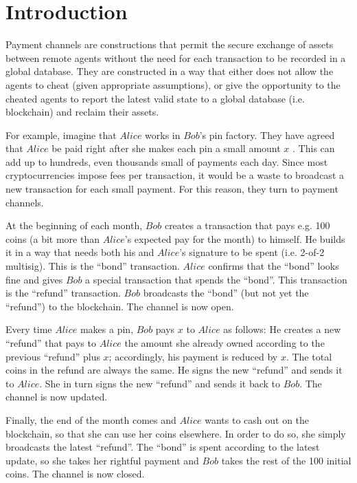 \section{Introduction}
  Payment channels are constructions that permit the secure exchange of assets between
  remote agents without the need for each transaction to be recorded in a global database.
  They are constructed in a way that either does not allow the agents to cheat (given
  appropriate assumptions), or give the opportunity to the cheated agents to report the
  latest valid state to a global database (i.e. blockchain) and reclaim their assets.

  For example, imagine that $Alice$ works in $Bob$'s pin factory. They have agreed that
  $Alice$ be paid right after she makes each pin a small amount $x$ \cite{bdevguide}. This
  can add up to hundreds, even thousands small of payments each day. Since most
  cryptocurrencies impose fees per transaction, it would be a waste to broadcast a new
  transaction for each small payment. For this reason, they turn to payment channels.

  At the beginning of each month, $Bob$ creates a transaction that pays e.g. 100 coins (a
  bit more than $Alice$'s expected pay for the month) to himself. He builds it in a way
  that needs both his and $Alice$'s signature to be spent (i.e. 2-of-2 multisig). This is
  the ``bond'' transaction. $Alice$ confirms that the ``bond'' looks fine and gives $Bob$
  a special transaction that spends the ``bond''. This transaction is the ``refund''
  transaction. $Bob$ broadcasts the ``bond'' (but not yet the ``refund'') to the
  blockchain. The channel is now open.

  Every time $Alice$ makes a pin, $Bob$ pays $x$ to $Alice$ as follows: He creates a new
  ``refund'' that pays to $Alice$ the amount she already owned according to the previous
  ``refund'' plus $x$; accordingly, his payment is reduced by $x$. The total coins in
  the refund are always the same. He signs the new ``refund'' and sends it to $Alice$. She
  in turn signs the new ``refund'' and sends it back to $Bob$. The channel is now updated.

  Finally, the end of the month comes and $Alice$ wants to cash out on the blockchain, so
  that she can use her coins elsewhere. In order to do so, she simply broadcasts the
  latest ``refund''. The ``bond'' is spent according to the latest update, so she takes
  her rightful payment and $Bob$ takes the rest of the 100 initial coins. The channel is
  now closed.
